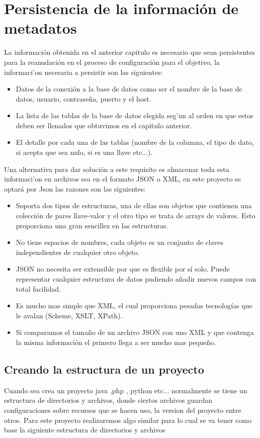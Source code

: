 \section{Persistencia de la informaci\'on de metadatos}
La informaci\'on obtenida en el anterior capitulo es necesario que sean persistentes para la reanudaci\'on  en el proceso de configuraci\'on para el objetivo, la informaci'on necesaria a persistir son las siguientes:
\begin{itemize}
\item Datos de la conexi\'on a la base de datos como ser el nombre de la base de datos, usuario, contrase\~na, puerto y el host.
\item La lista de las tablas de la base de datos elegida seg'un al orden en que estos deben ser llenados que obtuvimos en el capitulo anterior.
\item El detalle por cada una de las tablas (nombre de la columna, el tipo de dato, si acepta que sea nulo, si es una llave etc...).  
\end{itemize}
Una alternativa para dar soluci\'on a este requisito es almacenar toda esta informaci'on en archivos sea en el formato JSON o XML, en este proyecto se optar\'a por Json las razones son las siguientes:

\begin{itemize}
\item Soporta dos tipos de estructuras, una de ellas son objetos que contienen una colecci\'on de pares llave-valor y el otro tipo se trata de arrays de valores. Esto proporciona una gran sencillez en las estructuras.
\item No tiene espacios de nombres, cada objeto es un conjunto de claves independientes de cualquier otro objeto.
\item JSON no necesita ser extensible por que es flexible por s\'i solo. Puede representar cualquier estructura de datos pudiendo a\~nadir nuevos campos con total facilidad.
\item Es mucho mas simple que XML, el cual proporciona pesadas tecnolog\'ias que le avalan (Scheme, XSLT, XPath).
\item Si comparamos el tama\~no de un archivo JSON con uno XML y que contenga la misma informaci\'on el primero llega a ser mucho mas peque\~no.
\end{itemize} 
\subsection{Creando la estructura de un proyecto}
Cuando sea crea un proyecto java ,php , python etc... normalmente se tiene un estructura de directorios y archivos, donde ciertos archivos guardan configuraciones sobre recursos que se hacen uso, la version del proyecto entre otros. Para este proyecto realizaremos algo similar para lo cual se va tener como base la siguiente estructura de directorios y archivos

